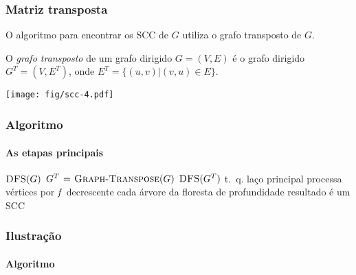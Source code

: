 \documentclass{beamer}
\begin{document}
\begin{frame}

\frametitle{Matriz transposta}

O algoritmo para encontrar os SCC de $G$ utiliza o grafo transposto de $G$.

\begin{definition}
O \emph{grafo transposto} de um grafo dirigido $G = (V, E)$ é 
o grafo dirigido $G^T = (V, E^T)$, onde $E^T = \{ (u, v) | (v, u) \in E\}$.

\end{definition}


\begin{center}
\texttt{[image: fig/scc-4.pdf]}
\end{center}

\end{frame}


\begin{frame}
\frametitle{Algoritmo}
\framesubtitle{As etapas principais}

\begin{codebox}
\li $\textnormal{\scshape DFS}(G)$
\li $G^T \mathrel{\hspace{1pt}=\hspace{1pt}} \textnormal{\scshape Graph-Transpose}(G)$
\li $\textnormal{\scshape DFS}(G^T)$ t.~q. laço principal processa vértices por $\id{f}$ decrescente
\li cada árvore da floresta de profundidade resultado é um SCC
\end{codebox}

\end{frame}


\begin{frame}
\frametitle{Ilustração}
\framesubtitle{Algoritmo}





\end{frame}
\end{document}

